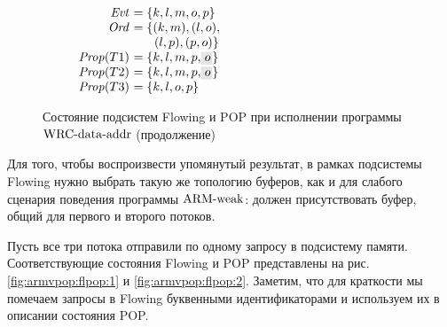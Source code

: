 \begin{figure}
  \begin{subfigure}{.5\textwidth}
\begin{center}
\end{center}
    \caption{}
    \label{fig:armvpop:flpop:11} 
  \end{subfigure}%
  \begin{subfigure}{.5\textwidth}
\begin{center}
\parbox{63mm}{$\begin{array}{@{}r@{~}l@{}}
  \Evt      &= \{k, l, m, o, p\} \\
  \Ord      &= \{ (k, m), (l, o), \\
            & ~~\quad (l, p), (p, o) \} \\
  \Prop(T1) &= \{k, l, m, p, \graybox{o}\} \\
  \Prop(T2) &= \{k, l, m, p, \graybox{o}\} \\
  \Prop(T3) &= \{k, l, o, p\} \\
\end{array}$}
\end{center}
    \caption{}
    \label{fig:armvpop:flpop:12}
  \end{subfigure}

  \caption{Состояние подсистем Flowing и POP при исполнении программы ${\rm WRC\text{-}data\text{-}addr}$ (продолжение)}
  \label{fig:armvpop:flpop}
\end{figure}

Для того, чтобы воспроизвести упомянутый результат, в рамках подсистемы Flowing нужно
выбрать такую же топологию буферов, как и для слабого сценария поведения программы
${\rm ARM\text{-}weak}$: должен присутствовать буфер, общий для первого и второго потоков.

Пусть все три потока отправили по одному запросу в подсистему памяти.
Соответствующие состояния Flowing и POP представлены на
рис. \ref{fig:armvpop:flpop:1} и \ref{fig:armvpop:flpop:2}.
Заметим, что для краткости мы помечаем запросы в Flowing буквенными
идентификаторами и используем их в описании состояния POP.

